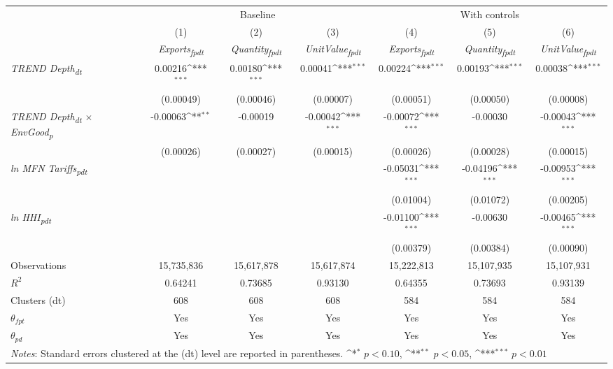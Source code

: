 {
\def\sym#1{\ifmmode^{#1}\else\(^{#1}\)\fi}
\begin{tabular}{l*{6}{c}}
\toprule
&\multicolumn{3}{c}{Baseline}&\multicolumn{3}{c}{With controls}\\\cmidrule(lr){2-4}\cmidrule(lr){5-7}
&(1)&(2)&(3)&(4)&(5)&(6)\\
&\textit{Exports\textsubscript{fpdt}}&\textit{Quantity\textsubscript{fpdt}}&\textit{UnitValue\textsubscript{fpdt}}&\textit{Exports\textsubscript{fpdt}}&\textit{Quantity\textsubscript{fpdt}}&\textit{UnitValue\textsubscript{fpdt}}\\
\midrule
\textit{TREND Depth\textsubscript{dt}} & 0.00216\sym{***} & 0.00180\sym{***} & 0.00041\sym{***} & 0.00224\sym{***} & 0.00193\sym{***} & 0.00038\sym{***}\\
 & (0.00049) & (0.00046) & (0.00007) & (0.00051) & (0.00050) & (0.00008)\\
\addlinespace
\textit{TREND Depth\textsubscript{dt} $\times$ EnvGood\textsubscript{p}} & -0.00063\sym{**} & -0.00019 & -0.00042\sym{***} & -0.00072\sym{***} & -0.00030 & -0.00043\sym{***}\\
 & (0.00026) & (0.00027) & (0.00015) & (0.00026) & (0.00028) & (0.00015)\\
\addlinespace
\textit{ln MFN Tariffs\textsubscript{pdt}} &  &  &  & -0.05031\sym{***} & -0.04196\sym{***} & -0.00953\sym{***}\\
 &  &  &  & (0.01004) & (0.01072) & (0.00205)\\
\addlinespace
\textit{ln HHI\textsubscript{pdt}} &  &  &  & -0.01100\sym{***} & -0.00630 & -0.00465\sym{***}\\
 &  &  &  & (0.00379) & (0.00384) & (0.00090)\\
\midrule
Observations & 15,735,836 & 15,617,878 & 15,617,874 & 15,222,813 & 15,107,935 & 15,107,931\\
$R^{2}$ & 0.64241 & 0.73685 & 0.93130 & 0.64355 & 0.73693 & 0.93139\\
Clusters (dt) & 608 & 608 & 608 & 584 & 584 & 584\\
$\theta_{fpt}$ & Yes & Yes & Yes & Yes & Yes & Yes\\
$\theta_{pd}$ & Yes & Yes & Yes & Yes & Yes & Yes\\
\bottomrule
\multicolumn{7}{l}{\footnotesize \textit{Notes}: Standard errors clustered at the (dt) level are reported in parentheses. \sym{*} \(p<0.10\), \sym{**} \(p<0.05\), \sym{***} \(p<0.01\)}\\
\end{tabular}
}
